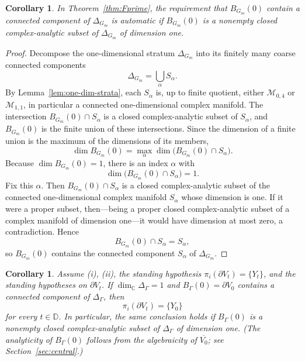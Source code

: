 \documentclass[12pt]{article}
\theoremstyle{plain}
\newtheorem{corollary}[theorem]{Corollary}
\theoremstyle{definition}
\theoremstyle{remark}
\newcommand{\D}{\mathbb D}
\newcommand{\C}{\mathbb C}
\newcommand{\M}{\mathcal M}
\begin{document}
\begin{corollary}\label{cor:analytic-Fprime}
In Theorem~\ref{thm:Fprime}, the requirement that \(B_{G_m}(0)\) contain a connected component of \(\Delta_{G_m}\) is automatic if \(B_{G_m}(0)\) is a nonempty closed complex-analytic subset of \(\Delta_{G_m}\) of dimension one.
\end{corollary}

\begin{proof}
Decompose the one-dimensional stratum \(\Delta_{G_m}\) into its finitely many coarse connected components
\[
\Delta_{G_m}=\bigcup_\alpha S_\alpha.
\]
By Lemma~\ref{lem:one-dim-strata}, each \(S_\alpha\) is, up to finite quotient, either \(\M_{0,4}\) or \(\M_{1,1}\), in particular a connected one-dimensional complex manifold.  The intersection \(B_{G_m}(0)\cap S_\alpha\) is a closed complex-analytic subset of \(S_\alpha\), and \(B_{G_m}(0)\) is the finite union of these intersections.  Since the dimension of a finite union is the maximum of the dimensions of its members,
\[
\dim B_{G_m}(0)=\max_\alpha \dim \bigl(B_{G_m}(0)\cap S_\alpha\bigr).
\]
Because \(\dim B_{G_m}(0)=1\), there is an index \(\alpha\) with
\[
\dim \bigl(B_{G_m}(0)\cap S_\alpha\bigr)=1.
\]
Fix this \(\alpha\).  Then \(B_{G_m}(0)\cap S_\alpha\) is a closed complex-analytic subset of the connected one-dimensional complex manifold \(S_\alpha\) whose dimension is one.  If it were a proper subset, then---being a proper closed complex-analytic subset of a complex manifold of dimension one---it would have dimension at most zero, a contradiction.  Hence
\[
B_{G_m}(0)\cap S_\alpha=S_\alpha,
\]
so \(B_{G_m}(0)\) contains the connected component \(S_\alpha\) of \(\Delta_{G_m}\).
\end{proof}

\begin{corollary}\label{cor:one-dimensional-stratum}
Assume (i), (ii), the standing hypothesis \(\pi_i(\partial V_t)=\{Y_t\}\), and the standing hypotheses on \(\partial V_t\).  If \(\dim_\C \Delta_\Gamma=1\) and \(B_\Gamma(0)=\partial V_0\) contains a connected component of \(\Delta_\Gamma\), then
\[
\pi_i(\partial V_t)=\{Y_0\}
\]
for every \(t\in\D\).  In particular, the same conclusion holds if \(B_\Gamma(0)\) is a nonempty closed complex-analytic subset of \(\Delta_\Gamma\) of dimension one.  (The analyticity of \(B_\Gamma(0)\) follows from the algebraicity of \(\overline{V_0}\); see Section~\ref{sec:central}.)
\end{corollary}
\end{document}
